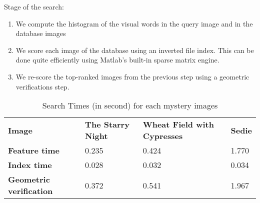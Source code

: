 \documentclass{article}
\begin{document}
Stage of the search:
\begin{enumerate}
\item We compute the histogram of the visual words in the query image and in the database images
\item We score each image of the database using an inverted file index. This can be done quite efficiently using Matlab's built-in sparse matrix engine.
\item We re-score the top-ranked images from the previous step using a geometric verifications step.
\end{enumerate}

\begin{table}[H]
\centering
\caption{Search Times (in second) for each mystery images}
\label{Images recognition}
\begin{tabular}{llll}
{\color[HTML]{000000} \textbf{Image}} & {\color[HTML]{000000} \textbf{The Starry Night}} & {\color[HTML]{000000} \textbf{Wheat Field with Cypresses}} & {\color[HTML]{000000} \textbf{Sedie}} \\
\textbf{Feature time} & 0.235 & 0.424 & 1.770 \\
\textbf{Index time} & 0.028 & 0.032 & 0.034 \\
\textbf{Geometric verification} & 0.372 & 0.541 & 1.967
\end{tabular}
\end{table}
\end{document}
